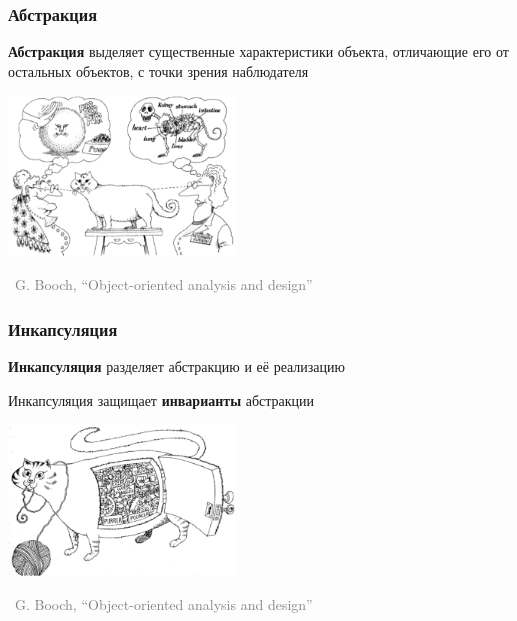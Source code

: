 \documentclass[xetex,mathserif,serif]{beamer}
\newcommand{\attribution}[1] {
    \begin{flushright}\begin{scriptsize}\textcolor{gray}{\textcopyright\, #1}\end{scriptsize}\end{flushright}
}
\begin{document}
    \begin{frame}
        \frametitle{Абстракция}
        \textbf{Абстракция} выделяет существенные характеристики объекта, отличающие его от остальных объектов, с точки зрения наблюдателя
        \vskip 1cm
        \begin{center}
            \includegraphics[width=0.45\textwidth]{abstraction.png}
        \end{center}
        \attribution{G. Booch, ``Object-oriented analysis and design''}
    \end{frame}

    \begin{frame}
        \frametitle{Инкапсуляция}
        \textbf{Инкапсуляция} разделяет абстракцию и её реализацию

        Инкапсуляция защищает \textbf{инварианты} абстракции
        \vskip 1cm
        \begin{center}
            \includegraphics[width=0.45\textwidth]{incapsulation.png}
        \end{center}
        \attribution{G. Booch, ``Object-oriented analysis and design''}
    \end{frame}
\end{document}
